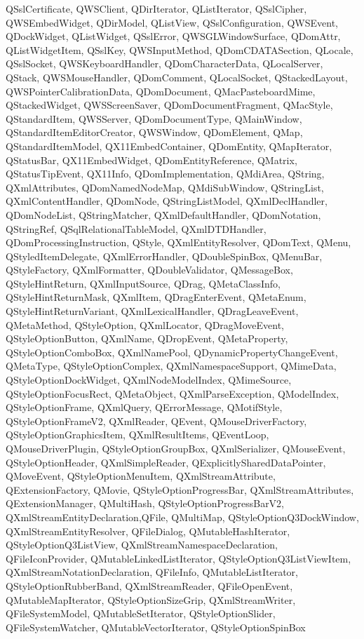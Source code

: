 {{	QSslCertificate, QWSClient, QDirIterator, QListIterator, QSslCipher, QWSEmbedWidget, QDirModel, QListView, QSslConfiguration, QWSEvent, QDockWidget, QListWidget, QSslError, QWSGLWindowSurface, QDomAttr, QListWidgetItem, QSslKey, QWSInputMethod, QDomCDATASection, QLocale, QSslSocket, QWSKeyboardHandler, QDomCharacterData, QLocalServer, QStack, QWSMouseHandler, QDomComment, QLocalSocket, QStackedLayout, QWSPointerCalibrationData, QDomDocument, QMacPasteboardMime, QStackedWidget, QWSScreenSaver, QDomDocumentFragment, QMacStyle, QStandardItem, QWSServer, QDomDocumentType, QMainWindow, QStandardItemEditorCreator, QWSWindow, QDomElement, QMap,
	QStandardItemModel, QX11EmbedContainer, QDomEntity, QMapIterator, QStatusBar, QX11EmbedWidget, QDomEntityReference, QMatrix, QStatusTipEvent, QX11Info, QDomImplementation, QMdiArea, QString, QXmlAttributes, QDomNamedNodeMap, QMdiSubWindow, QStringList, QXmlContentHandler, QDomNode,
	QStringListModel, QXmlDeclHandler, QDomNodeList, QStringMatcher, QXmlDefaultHandler, QDomNotation,  QStringRef, QSqlRelationalTableModel, QXmlDTDHandler, QDomProcessingInstruction, QStyle, QXmlEntityResolver, QDomText, QMenu, QStyledItemDelegate, QXmlErrorHandler, QDoubleSpinBox,
	QMenuBar, QStyleFactory, QXmlFormatter, QDoubleValidator, QMessageBox, QStyleHintReturn, QXmlInputSource, QDrag, QMetaClassInfo, QStyleHintReturnMask, QXmlItem, QDragEnterEvent, QMetaEnum, QStyleHintReturnVariant, QXmlLexicalHandler, QDragLeaveEvent, QMetaMethod, QStyleOption, QXmlLocator, QDragMoveEvent, QStyleOptionButton, QXmlName, QDropEvent, QMetaProperty, QStyleOptionComboBox, QXmlNamePool, QDynamicPropertyChangeEvent, QMetaType, QStyleOptionComplex,
	QXmlNamespaceSupport, QMimeData, QStyleOptionDockWidget, QXmlNodeModelIndex, QMimeSource, QStyleOptionFocusRect, QMetaObject, QXmlParseException, QModelIndex, QStyleOptionFrame, QXmlQuery, QErrorMessage, QMotifStyle, QStyleOptionFrameV2, QXmlReader, QEvent, QMouseDriverFactory, QStyleOptionGraphicsItem, QXmlResultItems, QEventLoop, QMouseDriverPlugin, QStyleOptionGroupBox, QXmlSerializer, QMouseEvent, QStyleOptionHeader, QXmlSimpleReader, QExplicitlySharedDataPointer, QMoveEvent, QStyleOptionMenuItem, QXmlStreamAttribute, QExtensionFactory, QMovie,
	QStyleOptionProgressBar, QXmlStreamAttributes, QExtensionManager, QMultiHash, QStyleOptionProgressBarV2, QXmlStreamEntityDeclaration,QFile, QMultiMap,
	QStyleOptionQ3DockWindow, QXmlStreamEntityResolver, QFileDialog, QMutableHashIterator, QStyleOptionQ3ListView, QXmlStreamNamespaceDeclaration, QFileIconProvider,
	QMutableLinkedListIterator, QStyleOptionQ3ListViewItem, QXmlStreamNotationDeclaration, QFileInfo, QMutableListIterator, QStyleOptionRubberBand, QXmlStreamReader, QFileOpenEvent, QMutableMapIterator, QStyleOptionSizeGrip, QXmlStreamWriter, QFileSystemModel, QMutableSetIterator, QStyleOptionSlider, QFileSystemWatcher, QMutableVectorIterator, QStyleOptionSpinBox
}}
